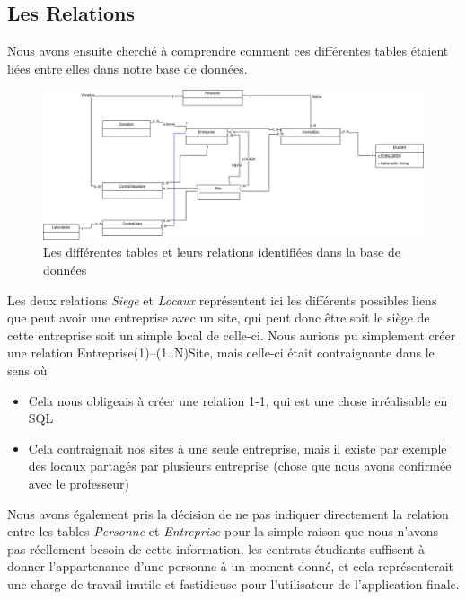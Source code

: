 \documentclass[french,12pt,a4paper,titlepage]{report}
\begin{document}
		\subsection{Les Relations} Nous avons ensuite cherché à comprendre comment ces différentes tables étaient liées entre elles dans notre base de données.
		\newline
		\begin{figure}[ht]
			\centering
			\includegraphics[width=1\linewidth]{rapports_assets/diag_db_table_relation.png}
			\caption{Les différentes tables et leurs relations identifiées dans la base de données}
		\end{figure}
		\newline
		Les deux relations \textit{Siege} et \textit{Locaux} représentent ici les différents possibles liens que peut avoir une entreprise avec un site, qui peut donc être soit le siège de cette entreprise soit un simple local de celle-ci.
		\newline
		Nous aurions pu simplement créer une relation Entreprise(1)--(1..N)Site, mais celle-ci était contraignante dans le sens où
		\begin{itemize}
		\item Cela nous obligeais à créer une relation 1-1, qui est une chose irréalisable en SQL
		\item Cela contraignait nos sites à une seule entreprise, mais il existe par exemple des locaux partagés par plusieurs entreprise (chose que nous avons confirmée avec le professeur)
		\end{itemize}
		Nous avons également pris la décision de ne pas indiquer directement la relation entre les tables \textit{Personne} et \textit{Entreprise} pour la simple raison que nous n'avons pas réellement besoin de cette information, les contrats étudiants suffisent à donner l'appartenance d'une personne à un moment donné, et cela représenterait une charge de travail inutile et fastidieuse pour l'utilisateur de l'application finale.
\end{document}
